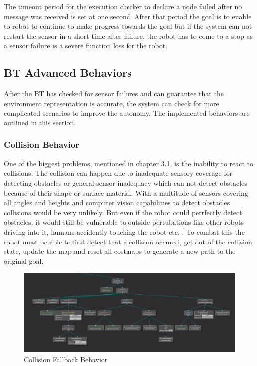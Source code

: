 The timeout period for the execution checker to declare a node failed after no message was received is set at one second. 
After that period the goal is to enable to robot to continue to make progress towards the goal but if the system can not restart the sensor in a short time after failure, the robot has to come to a stop as a sensor failure is a severe function loss for the robot.


\subsection{BT Advanced Behaviors}
After the BT has checked for sensor failures and can guarantee that the environment representation is accurate, the system can check for more complicated scenarios to improve the autonomy. The implemented behaviors are outlined in this section. 


\subsubsection{Collision Behavior}

One of the biggest problems, mentioned in chapter 3.1, is the inability to react to collisions. The collision can happen due to inadequate sensory coverage for detecting obstacles or general sensor inadequacy which can not detect obstacles because of their shape or surface material. With a multitude of sensors covering all angles and heights and computer vision capabilities to detect obstacles collisions would be very unlikely. But even if the robot could perrfectly detect obstacles, it would still be vulnerable to outside pertubations like other robots driving into it, humans accidently touching the robot etc. . 
To combat this the robot must be able to first detect that a collision occured, get out of the collision state, update the map and reset all costmaps to generate a new path to the original goal. 

\begin{figure}[ht]
	\label{fig:collision_fallback}
	\includegraphics[width=1.0\textwidth]{images/collision_fallback.png}
	\caption{Collision Fallback Behavior}
\end{figure}

